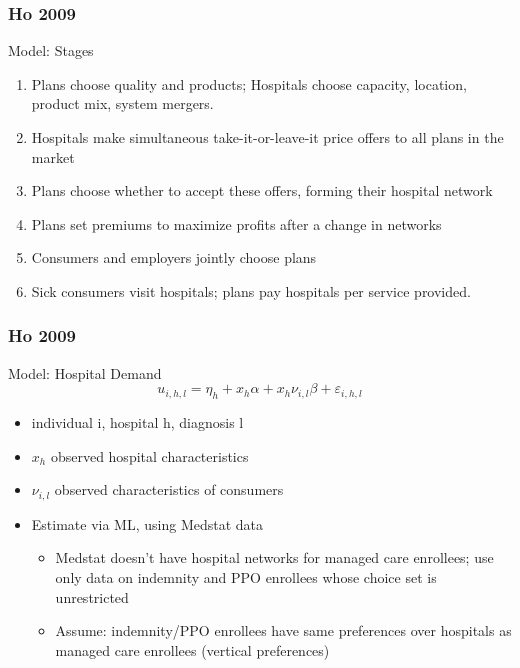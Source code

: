 \documentclass[aspectratio=169,11pt]{beamer}
\begin{document}
\begin{frame}
\frametitle{Ho 2009}

Model: Stages
\begin{enumerate}
\item Plans choose quality and products; Hospitals choose capacity, location, product mix, system mergers.
\item Hospitals make simultaneous take-it-or-leave-it price offers to all plans in the market
\item Plans choose whether to accept these offers, forming their hospital network
\item Plans set premiums to maximize profits after a change in networks
\item Consumers and employers jointly choose plans
\item Sick consumers visit hospitals; plans pay hospitals per service provided.
\end{enumerate}
\end{frame}
\begin{frame}
\frametitle{Ho 2009}

Model: Hospital Demand
\[
u_{i,h,l}=\eta _{h}+x_{h}\alpha +x_{h}\nu _{i,l}\beta +\varepsilon _{i,h,l}
\]

\begin{itemize}
\item individual i, hospital h, diagnosis l
\item $x_{h}$ observed hospital characteristics
\item $\nu_{i,l}$ observed characteristics of consumers
\item Estimate via ML, using Medstat data
\begin{itemize}
\item Medstat doesn't have hospital networks for managed care enrollees; use only data on indemnity and PPO enrollees whose choice set is unrestricted
\item Assume: indemnity/PPO enrollees have same preferences over hospitals as managed care enrollees (vertical preferences)
\end{itemize}
\end{itemize}

\end{frame}
\end{document}
